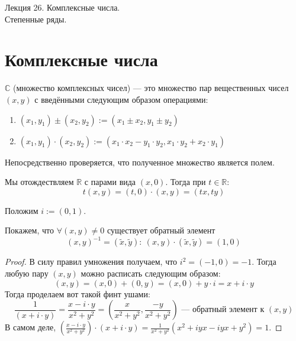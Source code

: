 \documentclass[11pt]{article}
\begin{document}
\begin{titlepage}
    \centering
    \vspace*{\fill}  %

    {\Huge Лекция 26. Комплексные числа. \\ Степенные ряды. \par}

    \vspace*{\fill}  %
\end{titlepage}

\setcounter{page}{1}

\section{Комплексные числа}
 
\begin{definition}
    $\mathbb{C}$ (множество комплексных чисел) --- это множество пар вещественных чисел $(x, y)$ с введёнными следующим образом операциями:
    \begin{enumerate}
        \item $(x_1, y_1) \pm (x_2, y_2) := (x_1 \pm x_2, y_1 \pm y_2)$
        \item $(x_1, y_1) \cdot (x_2, y_2) := (x_1 \cdot x_2 - y_1 \cdot y_2, x_1 \cdot y_2 + x_2 \cdot y_1)$
    \end{enumerate} 
\end{definition}

\begin{remark}
    Непосредственно проверяется, что полученное множество является полем.
\end{remark}

\begin{remark}
    Мы отождествляем $\mathbb{R}$ с парами вида $(x, 0)$. Тогда при $t \in \mathbb{R}$: \[t (x, y) = (t, 0) \cdot (x, y) = (tx, ty)\]
\end{remark}

\begin{definition}
    Положим $i := (0, 1)$.
\end{definition}

\begin{remark}
    Покажем, что $\forall (x, y) \neq 0$ существует обратный элемент \[(x, y)^{-1} = (\widetilde{x}, \widetilde{y}): \ (x, y) \cdot (\widetilde{x}, \widetilde{y}) = (1, 0)\]
\end{remark}

\begin{proof}
    В силу правил умножения получаем, что $i^2 = (-1, 0) = -1$. Тогда любую пару $(x, y)$ можно расписать следующим образом: \[(x, y) = (x, 0) + (0, y) = (x, 0) + y \cdot i = x + i \cdot y\]
    Тогда проделаем вот такой финт ушами: \[\frac{1}{(x + i \cdot y)} = \frac{x - i \cdot y}{x^2 + y^2} = \left( \frac{x}{x^2 + y^2}, \frac{-y}{x^2 + y^2}\right) \text{ --- обратный элемент к } (x, y)\]
    В самом деле,  $\displaystyle \left(\frac{x - i\cdot y}{x^2 + y^2}\right) \cdot \left(x + i\cdot y\right) = \frac{1}{x^2 + y^2} (x^2 + i y x - i y x + y^2) = 1$.
\end{proof}
\end{document}
